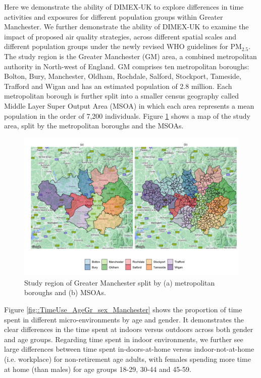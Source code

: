 \documentclass{article}
\begin{document}
\noindent Here we demonstrate the ability of DIMEX-UK to explore differences in time activities and exposures for different population groups within Greater Manchester. We further demonstrate the ability of DIMEX-UK to examine the impact of proposed air quality strategies, across different spatial scales and different population groups under the newly revised WHO guidelines for PM$_{2.5}$. The study region is the Greater Manchester (GM) area, a combined metropolitan authority in North-west of England. GM comprises ten metropolitan boroughs: Bolton, Bury, Manchester, Oldham, Rochdale, Salford, Stockport, Tameside, Trafford and Wigan and has an estimated population of 2.8 million. Each metropolitan borough is further split into a smaller census geography called Middle Layer Super Output Area (MSOA) in which each area represents a mean population in the order of 7,200 individuals. Figure \ref{fig::studyregion} shows a map of the study area, split by the metropolitan boroughs and the MSOAs. \\

\begin{figure}[!hbtp]
	\centering
	\includegraphics[width=0.95\linewidth]{Figures/Manchester_GGMAP}		
	\caption{Study region of Greater Manchester split by (a) metropolitan boroughs and (b) MSOAs. } \label{fig::studyregion}
\end{figure}

\noindent Figure \ref{fig::TimeUse_AgeGr_sex_Manchester} shows the proportion of time spent in different micro-environments by age and gender. It demonstrates the clear differences in the time spent at indoors versus outdoors across both gender and age groups. Regarding time spent in indoor environments, we further see large differences between time spent in-doors-at-home versus indoor-not-at-home  (i.e. workplace) for non-retirement age adults, with females spending more time at home (than males) for age groups 18-29, 30-44 and 45-59. \\
\end{document}
